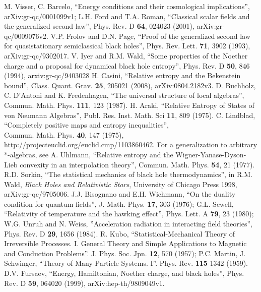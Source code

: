 \documentclass{article}
\begin{document}
\begin{thebibliography}{99}
M. Visser, C. Barcelo, ``Energy conditions and their cosmological implications'', 	arXiv:gr-qc/0001099v1; L.H. Ford and T.A. Roman, ``Classical scalar fields and the generalized second law'', Phys. Rev. D \textbf{64}, 024023 (2001), arXiv:gr-qc/0009076v2.
V.P. Frolov and D.N. Page, ``Proof of the generalized second law for quasistationary semiclassical black holes'', Phys. Rev. Lett. \textbf{71}, 3902 (1993), arXiv:gr-qc/9302017.
V. Iyer and R.M. Wald, ``Some properties of the Noether charge and a proposal for dynamical black hole entropy'', Phys. Rev. D \textbf{50}, 846 (1994), arxiv:gr-qc/9403028
H. Casini, ``Relative entropy and the Bekenstein bound'', Class. Quant. Grav. \textbf{25}, 205021 (2008), arXiv:0804.2182v3.
D. Buchholz, C. D'Antoni and K. Fredenhagen, ``The universal structure of local algebras'', Commun. Math. Phys. \textbf{111}, 123 (1987).
H. Araki, ``Relative Entropy of States of von Neumann Algebras'', Publ. Res. Inst. Math. Sci \textbf{11}, 809 (1975).
C. Lindblad, ``Completely positive maps and entropy inequalities'', \\Commun. Math. Phys. \textbf{40}, 147 (1975), \\http://projecteuclid.org/euclid.cmp/1103860462.  For a generalization to arbitrary *-algebras, see A. Uhlmann, ``Relative entropy and the Wigner-Yanase-Dyson-Lieb convexity in an interpolation theory'', Commun. Math. Phys. \textbf{54}, 21 (1977).
R.D. Sorkin, ``The statistical mechanics of black hole thermodynamics'', in R.M. Wald, \textit{Black Holes and Relativistic Stars}, University of Chicago Press 1998, arXiv:gr-qc/9705006.
J.J. Bisognano and E.H. Wichmann, ``On the duality condition for quantum fields'', J. Math. Phys. \textbf{17}, 303 (1976); G.L. Sewell, ``Relativity of temperature and the hawking effect'', Phys. Lett. A \textbf{79}, 23 (1980); W.G. Unruh and N. Weiss, ''Acceleration radiation in interacting field theories'', Phys. Rev. D \textbf{29}, 1656 (1984).  
R. Kubo, ``Statistical-Mechanical Theory of Irreversible Processes. I. General Theory and Simple Applications to Magnetic and Conduction Problems''. J. Phys. Soc. Jpn. \textbf{12}, 570 (1957); P.C. Martin, J. Schwinger,  ``Theory of Many-Particle Systems. I''. Phys. Rev. \textbf{115} 1342 (1959).
D.V. Fursaev, ``Energy, Hamiltonian, Noether charge, and black holes'', Phys. Rev. D \textbf{59}, 064020 (1999), arXiv:hep-th/9809049v1.

\end{thebibliography}
\end{document}
